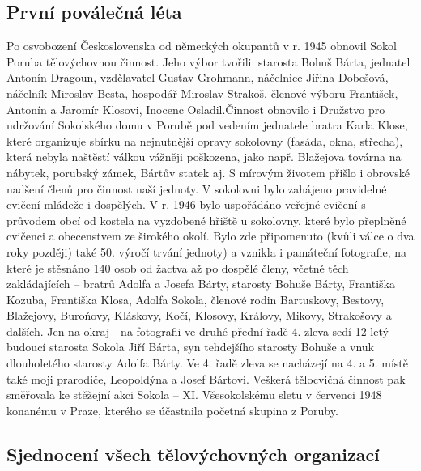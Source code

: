 \documentclass[openany]{report}
\begin{document}
\subsection{První poválečná léta}

Po osvobození Československa od německých okupantů v r. 1945 obnovil Sokol Poruba tělovýchovnou činnost. Jeho výbor tvořili: starosta Bohuš Bárta, jednatel Antonín Dragoun, vzdělavatel Gustav Grohmann, náčelnice Jiřina Dobešová, náčelník Miroslav Besta, hospodář Miroslav Strakoš, členové výboru František, Antonín a Jaromír Klosovi, Inocenc Osladil.Činnost obnovilo i Družstvo pro udržování Sokolského domu v Porubě pod vedením jednatele bratra Karla Klose, které organizuje sbírku na nejnutnější opravy sokolovny (fasáda, okna, střecha), která nebyla naštěstí válkou vážněji poškozena, jako např. Blažejova továrna na nábytek, porubský zámek, Bártův statek aj. S mírovým životem přišlo i obrovské nadšení členů pro činnost naší jednoty. V sokolovni bylo zahájeno pravidelné cvičení mládeže i dospělých. V r. 1946 bylo uspořádáno veřejné cvičení s průvodem obcí od kostela na vyzdobené hřiště u sokolovny, které bylo přeplněné cvičenci a obecenstvem ze širokého okolí.  Bylo zde připomenuto (kvůli válce o dva roky později) také 50. výročí trvání jednoty) a vznikla i památeční fotografie, na které je stěsnáno 140 osob od žactva až po dospělé členy, včetně těch zakládajících – bratrů Adolfa a Josefa Bárty, starosty Bohuše Bárty, Františka Kozuba, Františka Klosa, Adolfa Sokola, členové rodin Bartuskovy, Bestovy, Blažejovy, Buroňovy, Kláskovy, Kočí, Klosovy, Královy, Mikovy, Strakošovy a dalších. Jen na okraj  - na fotografii ve druhé přední řadě 4. zleva sedí 12 letý budoucí starosta Sokola Jiří Bárta, syn tehdejšího starosty Bohuše a vnuk dlouholetého starosty Adolfa Bárty. Ve 4. řadě zleva se nacházejí na 4. a 5. místě také moji prarodiče, Leopoldýna a Josef Bártovi. Veškerá tělocvičná činnost pak směřovala ke stěžejní akci Sokola – XI. Všesokolskému sletu v červenci 1948 konanému v Praze, kterého se účastnila početná skupina z Poruby.

\subsection{Sjednocení všech tělovýchovných organizací}
\end{document}
